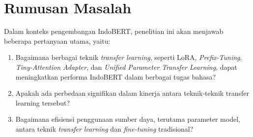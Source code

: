 \section{Rumusan Masalah}

Dalam konteks pengembangan IndoBERT, penelitian ini akan menjawab beberapa pertanyaan utama, yaitu:

\begin{enumerate}
    \item Bagaimana berbagai teknik \textit{transfer learning}, seperti LoRA, \textit{Prefix-Tuning}, \textit{Tiny-Attention Adapter}, dan \textit{Unified Parameter Transfer Learning}, dapat meningkatkan performa IndoBERT dalam berbagai tugas bahasa?
    \item Apakah ada perbedaan signifikan dalam kinerja antara teknik-teknik transfer learning tersebut?
    \item Bagaimana efisiensi penggunaan sumber daya, terutama parameter model, antara teknik \textit{transfer learning} dan \textit{fine-tuning} tradisional?
\end{enumerate}